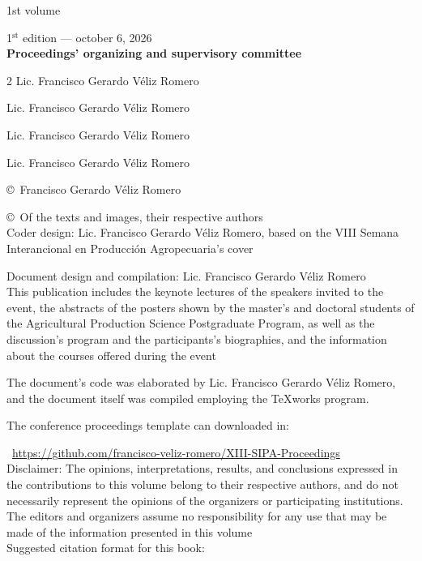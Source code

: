 \documentclass{clase/sipa}
\begin{document}
1st volume

1$^{\text{st}}$ edition  --- october 6, 2026\\

\textbf{Proceedings' organizing and supervisory committee}

\setlength{\columnsep}{0pt}
\begin{multicols}{2}
\centering
Lic. Francisco Gerardo Véliz Romero

Lic. Francisco Gerardo Véliz Romero

Lic. Francisco Gerardo Véliz Romero

Lic. Francisco Gerardo Véliz Romero
\end{multicols}

\copyright\, Francisco Gerardo Véliz Romero

\copyright\, Of the texts and images, their respective authors\\

Coder design: Lic. Francisco Gerardo Véliz Romero, based on the VIII Semana Interancional en Producción Agropecuaria's cover

Document design and compilation: Lic. Francisco Gerardo Véliz Romero\\

This publication includes the keynote lectures of the speakers invited to the event, the abstracts of the posters shown by the master's and doctoral students of the Agricultural Production Science Postgraduate Program, as well as the discussion's program and the participants's biographies, and the information about the courses offered during the event

The document's code was elaborated by Lic. Francisco Gerardo Véliz Romero, and the document itself was compiled employing the TeXworks program.

The conference proceedings template can downloaded in: 

\faGithub\, \url{https://github.com/francisco-veliz-romero/XIII-SIPA-Proceedings}\\

Disclaimer: The opinions, interpretations, results, and conclusions expressed in the contributions to this volume belong to their respective authors, and do not necessarily represent the opinions of the organizers or participating institutions. The editors and organizers assume no responsibility for any use that may be made of the information presented in this volume\\

Suggested citation format for this book:
\end{document}
